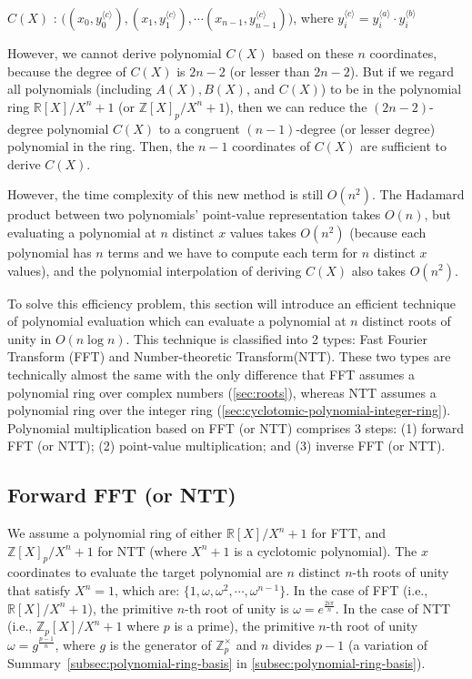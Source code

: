 $C(X)$ : $\bm ( ({x}_0, {y}_0^{\langle c \rangle}), ({x}_1, {y}_1^{\langle c \rangle}), \cdots ({x}_{n-1}, {y}_{n-1}^{\langle c \rangle}) \bm )$, where ${y}_i^{\langle c \rangle} = {y}_i^{\langle a \rangle} \cdot {y}_i^{\langle b \rangle}$

However, we cannot derive polynomial $C(X)$ based on these $n$ coordinates, because the degree of $C(X)$ is $2n-2$ (or lesser than $2n-2$). But if we regard all polynomials (including $A(X), B(X)$, and $C(X)$) to be in the polynomial ring $\mathbb{R}[X]/ X^n + 1$ (or $\mathbb{Z}[X]_p/ X^n + 1$), then we can reduce the $(2n-2)$-degree polynomial $C(X)$ to a congruent $(n-1)$-degree (or lesser degree) polynomial in the ring. Then, the $n-1$ coordinates of $C(X)$ are sufficient to derive $C(X)$. 

However, the time complexity of this new method is still $O(n^2)$. The Hadamard product between two polynomials' point-value representation takes $O(n)$, but evaluating a polynomial at $n$ distinct $x$ values takes $O(n^2)$ (because each polynomial has $n$ terms and we have to compute each term for $n$ distinct $x$ values), and the polynomial interpolation of deriving $C(X)$ also takes $O(n^2)$. 

To solve this efficiency problem, this section will introduce an efficient technique of polynomial evaluation which can evaluate a polynomial at $n$ distinct roots of unity in $O(n \log n)$. This technique is classified into 2 types: Fast Fourier Transform (FFT) and Number-theoretic Transform(NTT). These two types are technically almost the same with the only difference that FFT assumes a polynomial ring over complex numbers (\autoref{sec:roots}), whereas NTT assumes a polynomial ring over the integer ring (\autoref{sec:cyclotomic-polynomial-integer-ring}). Polynomial multiplication based on FFT (or NTT) comprises 3 steps: (1) forward FFT (or NTT); (2) point-value multiplication; and (3) inverse FFT (or NTT). 

\subsection{Forward FFT (or NTT)}
\label{subsec:ntt-forward}

We assume a polynomial ring of either $\mathbb{R}[X]/ X^n + 1$ for FTT, and $\mathbb{Z}[X]_p/ X^n + 1$ for NTT (where $X^n + 1$ is a cyclotomic polynomial). The $x$ coordinates to evaluate the target polynomial are $n$ distinct $n$-th roots of unity that satisfy $X^n = 1$, which are: $\{1, \omega, \omega^2, \cdots, \omega^{n-1}\}$. In the case of FFT (i.e., $\mathbb{R}[X] / X^n + 1$), the primitive $n$-th root of unity is $\omega = e^{\frac{2i\pi}{n}}$. In the case of NTT (i.e., $\mathbb{Z}_p[X] / X^n + 1$ where $p$ is a prime), the primitive $n$-th root of unity $\omega = g^{\frac{p-1}{n}}$, where $g$ is the generator of $\mathbb{Z}^{\times}_p$ and $n$ divides $p - 1$ (a variation of Summary~\ref*{subsec:polynomial-ring-basis} in \autoref{subsec:polynomial-ring-basis}). 

